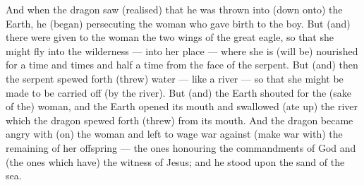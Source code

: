 \begin{pages}
\begin{Leftside}
		\pend
		\pstart
		And when the dragon saw (realised) that he was thrown into (down onto) the Earth, he (began) persecuting the woman who gave birth to the boy. But (and) there were given to the woman the two wings of the great eagle, so that she might fly into the wilderness — into her place — where she is (will be) nourished for a time and times and half a time from the face of the serpent. 
		\pend
		\pstart
		But (and) then the serpent spewed forth (threw) water — like a river — so that she might be made to be carried off (by the river). But (and) the Earth shouted for the (sake of the) woman, and the Earth opened its mouth and swallowed (ate up) the river which the dragon spewed forth (threw) from its mouth. 
		\pend
		\pstart
		And the dragon became angry with (on) the woman and left to wage war against (make war with) the remaining of her offspring — the ones honouring the commandments of God and (the ones which have) the witness of Jesus; and he stood upon the sand of the sea. 
		\pend
        \endnumbering
    \end{Leftside}

\end{pages} 
\Pages

